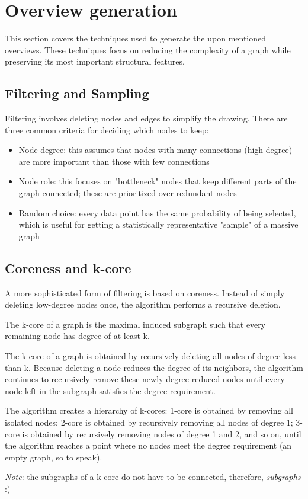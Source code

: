 \section{Overview generation}
This section covers the techniques used to generate the upon mentioned overviews. These techniques focus on reducing the complexity of a graph while preserving its most important structural features.

\subsection{Filtering and Sampling}
Filtering involves deleting nodes and edges to simplify the drawing. There are three common criteria for deciding which nodes to keep:
\begin{itemize}[noitemsep]
    \item Node degree: this assumes that nodes with many connections (high degree) are more important than those with few connections
    \item Node role: this focuses on "bottleneck" nodes that keep different parts of the graph connected; these are prioritized over redundant nodes
    \item Random choice: every data point has the same probability of being selected, which is useful for getting a statistically representative "sample" of a massive graph
\end{itemize}

\subsection{Coreness and k-core}
A more sophisticated form of filtering is based on coreness. Instead of simply deleting low-degree nodes once, the algorithm performs a recursive deletion. \par
\begin{definition}[k-core]
    The k-core of a graph is the maximal induced subgraph such that every remaining node has degree of at least k.\par
\end{definition}
The k-core of a graph is obtained by recursively deleting all nodes of degree less than k. Because deleting a node reduces the degree of its neighbors, the algorithm continues to recursively remove these newly degree-reduced nodes until every node left in the subgraph satisfies the degree requirement.\par
The algorithm creates a hierarchy of k-cores: 1-core is obtained by removing all isolated nodes; 2-core is obtained by recursively removing all nodes of degree 1; 3-core is obtained by recursively removing nodes of degree 1 and 2, and so on, until the algorithm reaches a point where no nodes meet the degree requirement (an empty graph, so to speak).\par
\textit{Note}: the subgraphs of a k-core do not have to be connected, therefore, \textit{subgraphs} :) \par

